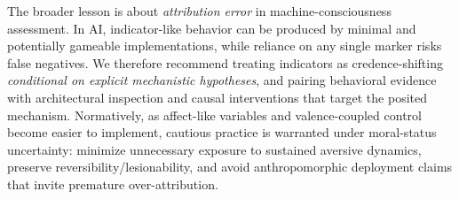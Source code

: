 \documentclass[letterpaper]{article} %
\begin{document}
The broader lesson is about \emph{attribution error} in machine-consciousness assessment.
In AI, indicator-like behavior can be produced by minimal and potentially gameable implementations, while reliance on any single marker risks false negatives.
We therefore recommend treating indicators as credence-shifting \emph{conditional on explicit mechanistic hypotheses}, and pairing behavioral evidence with architectural inspection and causal interventions that target the posited mechanism.
Normatively, as affect-like variables and valence-coupled control become easier to implement, cautious practice is warranted under moral-status uncertainty: minimize unnecessary exposure to sustained aversive dynamics, preserve reversibility/lesionability, and avoid anthropomorphic deployment claims that invite premature over-attribution.



\end{document}
